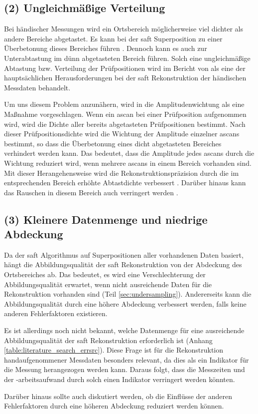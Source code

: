 \subsection*{(2) Ungleichmäßige Verteilung} %
Bei händischer Messungen wird ein Ortsbereich möglicherweise viel dichter als andere Bereiche abgetastet. Es kann bei der \acrshort{saft} Superposition zu einer Überbetonung dieses Bereiches führen \cite{Krieg18SAFTwithSmartInspect}. Dennoch kann es auch zur Unterabtastung im dünn abgetasteten Bereich führen. Solch eine ungleichmäßige Abtastung bzw. Verteilung der Prüfpositionen wird im Bericht von \cite{Mayer16SAFTwithSmallData} als eine der hauptsächlichen Herausforderungen bei der \acrshort{saft} Rekonstruktion der händischen Messdaten behandelt. \par
Um uns diesem Problem anzunähern, wird in \cite{Mayer16SAFTwithSmallData} die Amplitudenwichtung als eine Maßnahme vorgeschlagen. Wenn ein \gls{ascan} bei einer Prüfposition aufgenommen wird, wird die Dichte aller bereits abgetasteten Prüfpositionen bestimmt. Nach dieser Prüfpositionsdichte wird die Wichtung der Amplitude einzelner \glspl{ascan} bestimmt, so dass die Überbetonung eines dicht abgetasteten Bereiches verhindert werden kann. Das bedeutet, dass die Amplitude jedes \gls{ascan}s durch die Wichtung reduziert wird, wenn mehrere \glspl{ascan} in einem Bereich vorhanden sind. Mit dieser Herangehensweise wird die Rekonstruktionspräzision durch die im entsprechenden Bereich erhöhte Abtastdichte verbessert \cite{Mayer16SAFTwithSmallData}. Darüber hinaus kann das Rauschen in diesem Bereich auch verringert werden \cite{Mayer16SAFTwithSmallData}. \par

\subsection*{(3) Kleinere Datenmenge und niedrige Abdeckung} \label{sec:err_coverage} %
Da der \acrshort{saft} Algorithmus auf Superpositionen aller vorhandenen Daten basiert, hängt die Abbildungsqualität der \acrshort{saft} Rekonstruktion von der Abdeckung des Ortsbereiches ab. Das bedeutet, es wird eine Verschlechterung der Abbildungsqualität erwartet, wenn nicht ausreichende Daten für die Rekonstruktion vorhanden sind (Teil \ref{sec:undersampling}). Andererseits kann die Abbildungsqualität durch eine höhere Abdeckung verbessert werden, falls keine anderen Fehlerfaktoren existieren.\par
Es ist allerdings noch nicht bekannt, welche Datenmenge für eine ausreichende Abbildungsqualität der \acrshort{saft} Rekonstruktion erforderlich ist (Anhang \ref{table:literature_search_errsrc}). Diese Frage ist  für die Rekonstruktion handaufgenommener Messdaten besonders relevant, da dies als ein Indikator für die Messung herangezogen werden kann. Daraus folgt, dass die Messzeiten und der -arbeitsaufwand durch solch einen Indikator verringert werden könnten. \par
Darüber hinaus sollte auch diskutiert werden, ob die Einflüsse der anderen Fehlerfaktoren durch eine höheren Abdeckung reduziert werden können. \par


